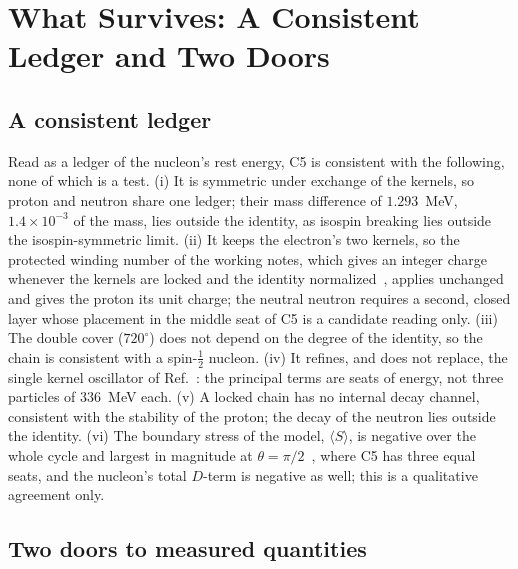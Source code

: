 \documentclass[%
 reprint, amsmath,amssymb, aps, prb, ]{revtex4-2}
\numberwithin{equation}{section}
\begin{document}
\section{What Survives: A Consistent Ledger and Two Doors}
\label{sec:survive}

\subsection{A consistent ledger}

Read as a ledger of the nucleon's rest energy, C5 is consistent with the following, none of which is a test. (i) It is symmetric under exchange of the kernels, so proton and neutron share one ledger; their mass difference of $1.293$~MeV, $1.4\times10^{-3}$ of the mass, lies outside the identity, as isospin breaking lies outside the isospin-symmetric limit. (ii) It keeps the electron's two kernels, so the protected winding number of the working notes, which gives an integer charge whenever the kernels are locked and the identity normalized~\cite{ref:trunks}, applies unchanged and gives the proton its unit charge; the neutral neutron requires a second, closed layer whose placement in the middle seat of C5 is a candidate reading only. (iii) The double cover ($720^\circ$) does not depend on the degree of the identity, so the chain is consistent with a spin-$\frac12$ nucleon. (iv) It refines, and does not replace, the single kernel oscillator of Ref.~\cite{ref:p61}: the principal terms are seats of energy, not three particles of $336$~MeV each. (v) A locked chain has no internal decay channel, consistent with the stability of the proton; the decay of the neutron lies outside the identity. (vi) The boundary stress of the model, $\langle S\rangle$, is negative over the whole cycle and largest in magnitude at $\theta=\pi/2$~\cite{ref:trunks}, where C5 has three equal seats, and the nucleon's total $D$-term is negative as well; this is a qualitative agreement only.

\subsection{Two doors to measured quantities}
\label{sec:doors}
\end{document}
